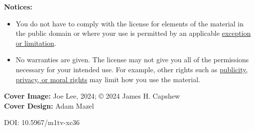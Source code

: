 \begin{flushleft}
\begin{small}
\textbf{Notices:}
\begin{itemize}
\tightlist
\item You do not have to comply with the license for elements of the material in the public domain or where your use is permitted by an applicable \href{https://creativecommons.org/licenses/by-nc-nd/4.0/?ref=chooser-v1#ref-exception-or-limitation}{exception or limitation}.\\
\item No warranties are given. The license may not give you all of the permissions necessary for your intended use. For example, other rights such as \href{https://creativecommons.org/licenses/by-nc-nd/4.0/?ref=chooser-v1#ref-publicity-privacy-or-moral-rights}{publicity, privacy, or moral rights} may limit how you use the material.
\end{itemize}


\textbf{Cover Image:} Joe Lee, 2024; © 2024 James H. Capshew\\
\textbf{Cover Design:} Adam Mazel

\vspace{2mm}
DOI: 10.5967/m1tv-xc36
\end{small}
\end{flushleft}

